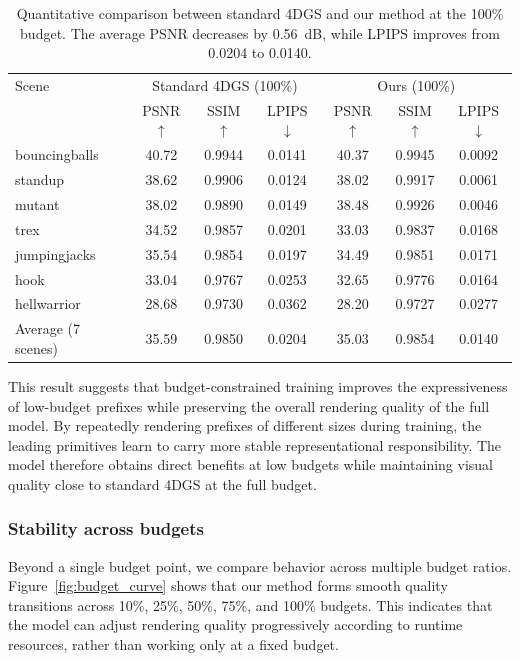 \documentclass[pdflatex,sn-mathphys]{sn-jnl}
\begin{document}
\begin{table}[!htbp]
\caption{Quantitative comparison between standard 4DGS and our method at the 100\% budget. The average PSNR decreases by 0.56~dB, while LPIPS improves from 0.0204 to 0.0140.}
\label{tab:main_full}
\centering
\small
\setlength{\tabcolsep}{4pt}
\begin{tabular}{lccc|ccc}
\toprule
Scene & \multicolumn{3}{c}{Standard 4DGS (100\%)} & \multicolumn{3}{c}{Ours (100\%)} \\
& PSNR$\uparrow$ & SSIM$\uparrow$ & LPIPS$\downarrow$ & PSNR$\uparrow$ & SSIM$\uparrow$ & LPIPS$\downarrow$ \\
\midrule
bouncingballs & 40.72 & 0.9944 & 0.0141 & 40.37 & 0.9945 & 0.0092 \\
standup       & 38.62 & 0.9906 & 0.0124 & 38.02 & 0.9917 & 0.0061 \\
mutant        & 38.02 & 0.9890 & 0.0149 & 38.48 & 0.9926 & 0.0046 \\
trex          & 34.52 & 0.9857 & 0.0201 & 33.03 & 0.9837 & 0.0168 \\
jumpingjacks  & 35.54 & 0.9854 & 0.0197 & 34.49 & 0.9851 & 0.0171 \\
hook          & 33.04 & 0.9767 & 0.0253 & 32.65 & 0.9776 & 0.0164 \\
hellwarrior   & 28.68 & 0.9730 & 0.0362 & 28.20 & 0.9727 & 0.0277 \\
\midrule
Average (7 scenes) & 35.59 & 0.9850 & 0.0204 & 35.03 & 0.9854 & 0.0140 \\
\bottomrule
\end{tabular}
\end{table}

This result suggests that budget-constrained training improves the expressiveness of low-budget prefixes while preserving the overall rendering quality of the full model. By repeatedly rendering prefixes of different sizes during training, the leading primitives learn to carry more stable representational responsibility. The model therefore obtains direct benefits at low budgets while maintaining visual quality close to standard 4DGS at the full budget.

\subsubsection{Stability across budgets}

Beyond a single budget point, we compare behavior across multiple budget ratios. Figure~\ref{fig:budget_curve} shows that our method forms smooth quality transitions across 10\%, 25\%, 50\%, 75\%, and 100\% budgets. This indicates that the model can adjust rendering quality progressively according to runtime resources, rather than working only at a fixed budget.
\end{document}

